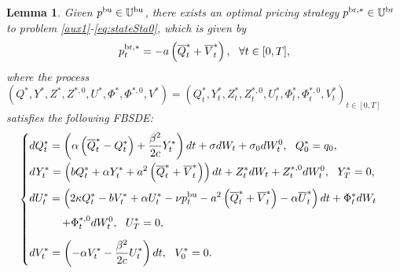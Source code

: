 \documentclass[11pt]{article}
\newtheorem{lemma}{Lemma}[section]
\numberwithin{equation}{section}
\begin{document}
\begin{lemma}\label{pbr}
Given $p^{{\rm bu}}\in\mathbb{U}^{\rm bu}$, there exists an optimal pricing strategy $p^{{\rm br},*}\in\mathbb{U}^{\rm br}$ to problem \eqref{aux1}-\eqref{eq:stateSta0}, which is given by
\begin{align}\label{asymptotic1}
    p_t^{{\rm br},*}=-a\left(\overline{Q}_t^*+\overline{V}_t^*\right),~~ \forall t\in [0, T], 
\end{align}
where the process $(Q^*,Y^*,Z^*,Z^{*,0},U^*,\Phi^*,\Phi^{*,0},V^*)=(Q_t^*,Y_t^*,Z_t^*,Z_t^{*,0},U_t^*,\Phi_t^*,\Phi_t^{*,0},V_t^*)_{t\in[0,T]}$ satisfies the following FBSDE:
\begin{align}\label{fbsde4.2}
\begin{cases}
\displaystyle dQ_t^*=\left(\alpha\left(\overline{Q}_t^*-Q_t^*\right)+\frac{\beta^2}{2c}Y_t^*\right)dt+\sigma dW_t+\sigma_0dW_t^0,~~Q_0^*=q_0,\\[0.8em]
\displaystyle dY_t^*=\left(bQ_t^*+\alpha Y_t^*+a^2\left(\overline{Q}_t^*+\overline{V}_t^*\right)\right)dt+Z_t^*dW_t+Z_t^{*,0}dW_t^0,~~Y_T^*=0,\\[0.8em]
\displaystyle dU_t^*=\left(2\kappa Q_t^*-bV_t^*+\alpha U_t^*-\nu p_t^{{\rm bu}}-a^2\left(\overline{Q}_t^*+\overline{V}_t^*\right)-\alpha \overline{U}_t^*\right)dt+\Phi_t^* dW_t\\[0.8em]
\displaystyle\qquad\quad+\Phi_t^{*, 0}dW_t^0,~~U_T^*=0,\\[0.8em]
\displaystyle dV_t^*=\left(-\alpha V_t^*-\frac{\beta^2}{2c}U_t^*\right)dt,~~V_0^*=0.
\end{cases}
\end{align}
\end{lemma}
    
\end{document}
